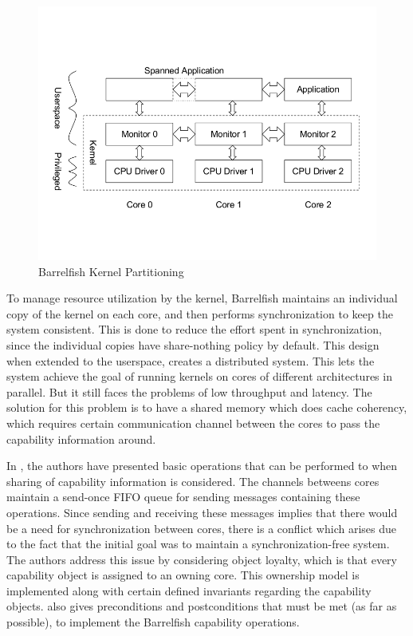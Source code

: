 \begin{figure}[h]
 \centering
\includegraphics[scale=0.25]{img/BF_sharing_res}
\caption{Barrelfish Kernel Partitioning}
\label{kernelpartition}
\end{figure}
To manage resource utilization by the kernel, Barrelfish maintains an individual copy of the kernel on each core, and then performs synchronization to keep the system consistent. This is done to reduce the effort spent in synchronization, since the individual  copies have share-nothing policy by default. This design when extended to the userspace, creates a distributed system. This lets the system achieve the goal of running kernels on cores of different architectures in parallel. But it still faces the problems of low throughput and latency. The solution for this problem is to have a shared memory which does cache coherency, which requires certain communication channel between the cores to pass the capability information around. 

In \cite{nevillmasters}, the authors have presented basic operations that can be performed to when sharing of capability information is considered. The channels betweens cores maintain a send-once FIFO queue for sending messages containing these operations. Since sending and receiving these messages implies that there would be a need for synchronization between cores, there is a conflict which arises due to the fact that the initial goal was to maintain a synchronization-free system. The authors address this issue by considering object loyalty, which is that every capability object is assigned to an owning core. This ownership model is implemented along with certain defined invariants regarding the capability objects. \cite{nevillmasters} also gives preconditions and postconditions that must be met (as far as possible), to implement the Barrelfish capability operations.

